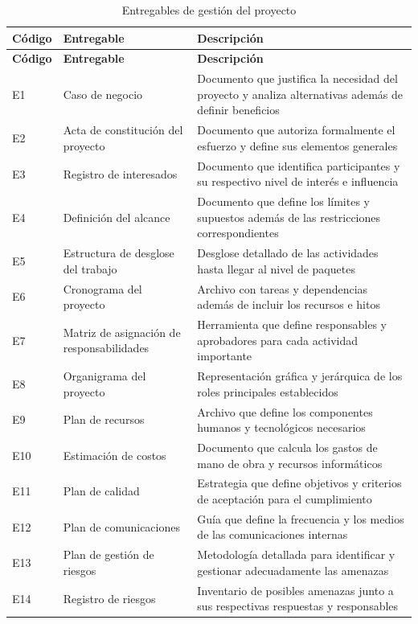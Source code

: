 \documentclass[11pt,spanish]{article}
\begin{document}
\begin{longtable}{L{1.5cm} L{5.8cm} L{7.1cm}}
\caption{Entregables de gestión del proyecto}\label{tab:entregables-gestion}\\[-0.5em]
\toprule
\textbf{Código} & \textbf{Entregable} & \textbf{Descripción} \\
\midrule
\endfirsthead
\toprule
\textbf{Código} & \textbf{Entregable} & \textbf{Descripción} \\
\midrule
\endhead
E1 & Caso de negocio & Documento que justifica la necesidad del proyecto y analiza alternativas además de definir beneficios \\
E2 & Acta de constitución del proyecto & Documento que autoriza formalmente el esfuerzo y define sus elementos generales \\
E3 & Registro de interesados & Documento que identifica participantes y su respectivo nivel de interés e influencia \\
E4 & Definición del alcance & Documento que define los límites y supuestos además de las restricciones correspondientes \\
E5 & Estructura de desglose del trabajo & Desglose detallado de las actividades hasta llegar al nivel de paquetes \\
E6 & Cronograma del proyecto & Archivo con tareas y dependencias además de incluir los recursos e hitos \\
E7 & Matriz de asignación de responsabilidades & Herramienta que define responsables y aprobadores para cada actividad importante \\
E8 & Organigrama del proyecto & Representación gráfica y jerárquica de los roles principales establecidos \\
E9 & Plan de recursos & Archivo que define los componentes humanos y tecnológicos necesarios \\
E10 & Estimación de costos & Documento que calcula los gastos de mano de obra y recursos informáticos \\
E11 & Plan de calidad & Estrategia que define objetivos y criterios de aceptación para el cumplimiento \\
E12 & Plan de comunicaciones & Guía que define la frecuencia y los medios de las comunicaciones internas \\
E13 & Plan de gestión de riesgos & Metodología detallada para identificar y gestionar adecuadamente las amenazas \\
E14 & Registro de riesgos & Inventario de posibles amenazas junto a sus respectivas respuestas y responsables \\

\end{longtable}
\end{document}
